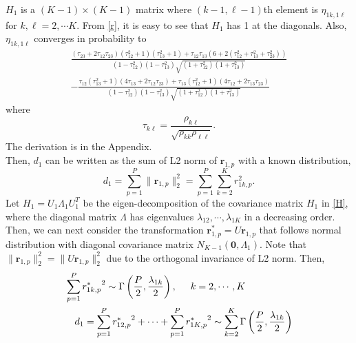 \documentclass[aoas,preprint]{imsart}
\numberwithin{equation}{section}
\theoremstyle{plain}
\begin{document}
$H_1$ is a $(K-1) \times (K-1)$ matrix where $(k-1, \ell-1)$th element is $\eta_{1k, 1\ell}$ for $k, \ell = 2, \cdots K$. From \ref{r}, it is easy to see that $H_1$ has 1 at the diagonals. Also, $\eta_{1k, 1\ell}$ converges in probability to
\begin{equation} \begin{multlined}
\frac{(\tau_{23}+2\tau_{12}\tau_{23})(\tau_{12}^2+1)(\tau_{13}^2+1) + \tau_{12}\tau_{13}(6+2(\tau_{12}^2+\tau_{13}^2+\tau_{23}^2))}{(1-{\tau}_{12}^2)(1-{\tau}_{13}^2)\sqrt{(1+{\tau}_{12}^2)(1+{\tau}_{13}^2)}} \\
- \frac{\tau_{12}(\tau_{13}^2+1)(4\tau_{13}+2\tau_{12}\tau_{23}) + \tau_{13}(\tau_{12}^2+1)(4\tau_{12}+2\tau_{13}\tau_{23})}{(1-{\tau}_{12}^2)(1-{\tau}_{13}^2)\sqrt{(1+{\tau}_{12}^2)(1+{\tau}_{13}^2)}}
\label{eq:eta}
\end{multlined} \end{equation}
where 
$${\tau}_{k\ell}= \frac{\rho_{k\ell}}{\sqrt{{\rho}_{kk}{\rho}_{\ell\ell}}}. $$
The derivation is in the Appendix. \\

Then, $d_1$ can be written as the sum of L2 norm of $\bm{r}_{1,p}$ with a known distribution, 
\begin{equation}
d_1 = \sum_{p=1}^{P} \|\bm{r}_{1,p}\|_2^2 = \sum_{p=1}^{P} \sum_{k=2}^K r_{1k,p}^2.
\label{d2}
\end{equation}
Let $H_1 = U_1 \Lambda_1 U_1^T$ be the eigen-decomposition of the covariance matrix $H_1$ in \ref{H}, where the diagonal matrix $\Lambda$ has eigenvalues $\lambda_{12}, \cdots, \lambda_{1K}$ in a decreasing order. Then, we can next consider the transformation $\bm{r}_{1,p}^* = U\bm{r}_{1,p}$ that follows normal distribution with diagonal covariance matrix $N_{K-1}(\bm{0}, \Lambda_1)$. Note that $\|\bm{r}_{1,p}\|_2^2 = \|U\bm{r}_{1,p}\|_2^2$ due to the orthogonal invariance of L2 norm. Then,
\begin{equation}
    \begin{multlined}
    \sum_{p=1}^{P} {r_{1k,p}^*}^2 \sim \Gamma \left( \frac{P}{2}, \frac{\lambda_{1k}}{2} \right), \hspace{5mm} k = 2, \cdots, K\\
    d_1 =  \sum_{p=1}^{P} {r_{12,p}^*}^2 + \cdots +\sum_{p=1}^P{r_{1K,p}^*}^2 \sim \sum_{k=2}^{K} \Gamma \left( \frac{P}{2}, \frac{\lambda_{1k}}{2}\right)
    \end{multlined}
    \label{eq:d_dist}
\end{equation}
\end{document}
